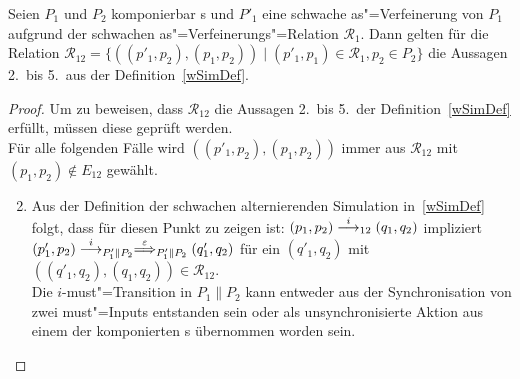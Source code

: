 \begin{Lem}
  \label{schwVerfParallelLem}
  Seien $P_1$ und $P_2$ komponierbar \MEIO{}s und $P'_1$ eine schwache
  as"=Verfeinerung von $P_1$ aufgrund der schwachen as"=Verfeinerungs"=Relation
  $\mathcal{R}_1$. Dann gelten für die Relation $\mathcal{R}_{12} =
  \{((p'_1,p_2),(p_1,p_2))\mid (p'_1,p_1)\in\mathcal{R}_1, p_2\in P_2\}$ die
  Aussagen 2.\ bis 5.\ aus der Definition~\ref{wSimDef}.
\end{Lem}
\begin{proof}
  Um zu beweisen, dass $\mathcal{R}_{12}$ die Aussagen 2.\ bis 5.\ der
  Definition~\ref{wSimDef} erfüllt, müssen diese geprüft werden.\\
  Für alle folgenden Fälle wird $((p'_1,p_2),(p_1,p_2))$ immer aus
  $\mathcal{R}_{12}$ mit $(p_1,p_2)\notin E_{12}$ gewählt.
  \begin{enumerate}
    \setcounter{enumi}{1}
    \item Aus der Definition der schwachen alternierenden
      Simulation in~\ref{wSimDef} folgt, dass für diesen Punkt zu zeigen ist:
      $(p_1,p_2)\must[i]_{12}(q_1,q_2)$ impliziert $(p'_1,p_2)
      \must[i]_{P'_1\|P_2} \weakmust[\varepsilon]_{P'_1\|P_2} (q'_1,q_2)$
      für ein $(q'_1,q_2)$ mit $((q'_1,q_2),(q_1,q_2)) \in \mathcal{R}_{12}$.\\
      Die $i$-must"=Transition in $P_1\|P_2$ kann entweder aus der
      Synchronisation von zwei must"=Inputs entstanden sein oder als
      unsynchronisierte Aktion aus einem der komponierten \MEIO{}s übernommen
      worden sein.
\end{enumerate}
\end{proof}
